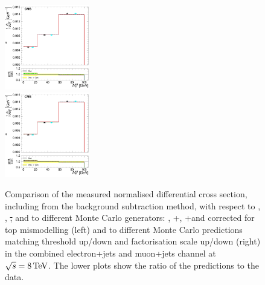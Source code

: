 \begin{figure}[hbtp]
     \includegraphics[width=0.33\textwidth]{Chapters/04_Analysis/04b_XSections/images/results/fit/8TeV/MT/central/normalised_xsection_combined_different_generators_with_bkgd_subtraction_results.pdf}\\
     \includegraphics[width=0.33\textwidth]{Chapters/04_Analysis/04b_XSections/images/results/fit/8TeV/MT/central/normalised_xsection_combined_systematics_shifts_with_bkgd_subtraction_results.pdf}\\
     \caption[Comparison of the measured normalised differential cross section, with background
     subtraction results, with respect to \met, \HT, \st, \wpt and \mt to different Monte Carlo generators and
     predictions at $\roots=8\TeV$.]{Comparison of the measured normalised differential cross section,
     including from the background subtraction method, with respect to \met, \HT, \st, \wpt and \mt to
     different Monte Carlo generators: \MADGRAPH, \POWHEG+\HERWIG, \POWHEG+\PYTHIA and \MADGRAPH corrected for
     top \pt mismodelling (left) and to different Monte Carlo predictions matching threshold up/down and
     factorisation scale up/down (right) in the combined electron+jets and muon+jets channel at
     $\roots=8\TeV$. The lower plots show the ratio of the predictions to the data.}
     \label{fig:result_with_background_subtraction_8TeV_combined}
\end{figure}